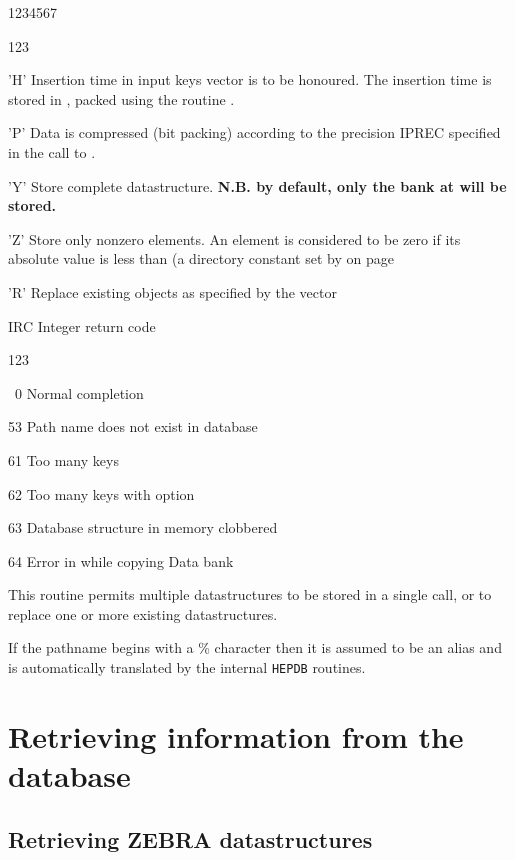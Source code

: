 \begin{DLtt}{1234567}
\begin{DLtt}{123}
    \item['H']Insertion time in input keys vector is to be honoured.
      The insertion time is stored in , packed using
      the routine .
    \item['P']Data is compressed (bit packing) according to the precision
      IPREC specified in the call to .
    \item['Y']Store complete datastructure. {\bf N.B. by default, only
              the bank at  will be stored.}
    \item['Z']Store only nonzero elements. An element is considered to
      be zero if its absolute value is less than  (a directory
      constant set by  on page~\pageref{CDMDIR}
    \item['R']Replace existing objects as specified by the vector
  \end{DLtt}
\item[IRC]Integer return code
  \begin{DLtt}{123}
    \item[\ 0]Normal completion
    \item[53]Path name does not exist in database
    \item[61]Too many keys
    \item[62]Too many keys with option 
    \item[63]Database structure in memory clobbered
    \item[64]Error in  while copying Data bank
  \end{DLtt}
\end{DLtt}

This routine permits multiple datastructures to be stored in
a single call, or to replace one or more existing datastructures.

If the pathname begins with a \% character then it is assumed to be
an alias and is automatically translated by the internal {\tt HEPDB}
routines.

\section{Retrieving information from the database}

\subsection{Retrieving ZEBRA datastructures}

